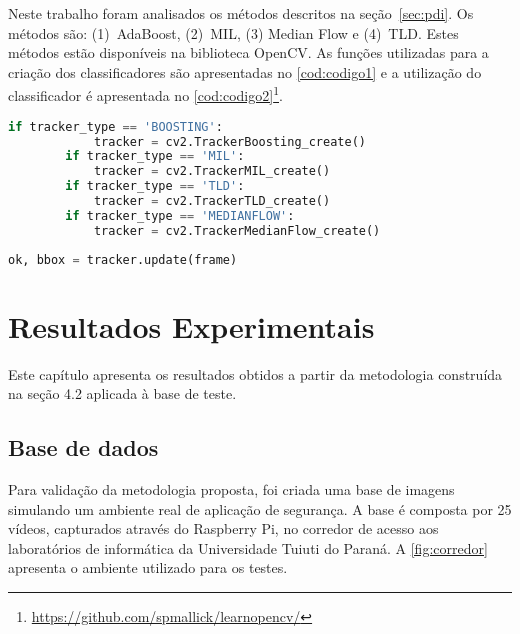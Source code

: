 \documentclass[12pt,oneside,a4paper,chapter=TITLE,section=TITLE,sumario=tradicional]{abntex2}
\begin{document}
Neste trabalho foram analisados os métodos descritos na seção~\autoref{sec:pdi}. Os métodos são: (1)~AdaBoost, (2)~MIL, (3) Median Flow e (4)~TLD. Estes métodos estão disponíveis na biblioteca OpenCV. As funções utilizadas para a criação dos classificadores são apresentadas no \autoref{cod:codigo1} e a utilização do classificador é apresentada no \autoref{cod:codigo2}\footnote{\url{https://github.com/spmallick/learnopencv/}}.

\begin{codigo}[htb]
    \begin{lstlisting}[language=python]
            if tracker_type == 'BOOSTING':
            tracker = cv2.TrackerBoosting_create()
        if tracker_type == 'MIL':
            tracker = cv2.TrackerMIL_create()
        if tracker_type == 'TLD':
            tracker = cv2.TrackerTLD_create()
        if tracker_type == 'MEDIANFLOW':
            tracker = cv2.TrackerMedianFlow_create()
    \end{lstlisting}
\end{codigo}

\begin{codigo}[htb]
    \begin{lstlisting}[language=python]
            ok, bbox = tracker.update(frame)
    \end{lstlisting}
\end{codigo}



\chapter{Resultados Experimentais}
\label{cap:resultados}

Este capítulo apresenta os resultados obtidos a partir da metodologia construída na seção 4.2 aplicada à base de teste.

\section{Base de dados}

Para validação da metodologia proposta, foi criada uma base de imagens simulando um ambiente real de aplicação de segurança. A base é composta por 25 vídeos, capturados através do Raspberry Pi, no corredor de acesso aos laboratórios de informática da Universidade Tuiuti do Paraná. A \autoref{fig:corredor} apresenta o ambiente utilizado para os testes.
\end{document}
